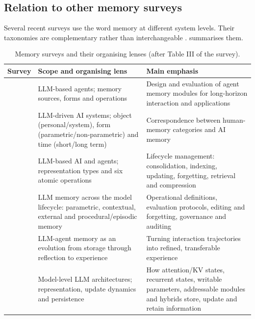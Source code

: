 \subsection{Relation to other memory surveys}\label{sec:c02-surveys}

Several recent surveys use the word memory at different system levels. Their taxonomies are
complementary rather than interchangeable \citep[\S II-D, Table III]{zhoubian2026memory}.
 summarises them.

\begin{table}[t]
\centering\small
\caption{Memory surveys and their organising lenses (after Table III of the survey).}
\label{tab:c02-surveys}
\begin{tabularx}{\textwidth}{@{}>{\raggedright\arraybackslash}p{3.1cm}>{\raggedright\arraybackslash}p{4.6cm}>{\raggedright\arraybackslash}X@{}}
\toprule
Survey & Scope and organising lens & Main emphasis \\
\midrule
\citet{zhang2024agentmemory} & LLM-based agents; memory sources, forms and operations &
Design and evaluation of agent memory modules for long-horizon interaction and applications \\
\citet{wu2025humanmemory} & LLM-driven AI systems; object (personal/system), form
(parametric/non-parametric) and time (short/long term) & Correspondence between human-memory
categories and AI memory \\
\citet{du2025rethinking} & LLM-based AI and agents; representation types and six atomic
operations & Lifecycle management: consolidation, indexing, updating, forgetting, retrieval and
compression \\
\citet{zhang2025llmmemory} & LLM memory across the model lifecycle: parametric, contextual,
external and procedural/episodic memory & Operational definitions, evaluation protocols,
editing and forgetting, governance and auditing \\
\citet{luo2026storage} & LLM-agent memory as an evolution from storage through reflection to
experience & Turning interaction trajectories into refined, transferable experience \\
\citet{zhoubian2026memory} & Model-level LLM architectures; representation, update dynamics and
persistence & How attention/KV states, recurrent states, writable parameters, addressable modules
and hybrids store, update and retain information \\
\bottomrule
\end{tabularx}
\end{table}

